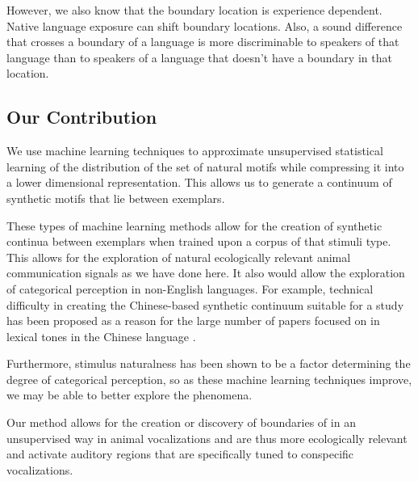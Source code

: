 However, we also know that the boundary location is experience dependent. Native language exposure can shift boundary locations. Also, a sound difference that crosses a boundary of a language is more discriminable to speakers of that language than to speakers of a language that doesn’t have a boundary in that location.


\subsection{Our Contribution}
We use machine learning techniques to approximate unsupervised statistical learning of the distribution of the set of natural motifs while compressing it into a lower dimensional representation. This allows us to generate a continuum of synthetic motifs that lie between exemplars.

These types of machine learning methods allow for the creation of synthetic continua between exemplars when trained upon a corpus of that stimuli type. This allows for the exploration of natural ecologically relevant animal communication signals as we have done here. It also would allow the exploration of categorical perception in non-English languages. For example, technical difficulty in creating the Chinese-based synthetic continuum suitable for a \CP study has been proposed as a reason for the large number of papers focused on \CP in lexical tones in the Chinese language \cite{zhang2013categorical}.

Furthermore, stimulus naturalness has been shown to be a factor determining the degree of categorical perception\cite{van1999categorical}, so as these machine learning techniques improve, we may be able to better explore the \CP phenomena.

Our method allows for the creation or discovery of boundaries of \CP in an unsupervised way in animal vocalizations and are thus more ecologically relevant and activate auditory regions that are specifically tuned to conspecific vocalizations.